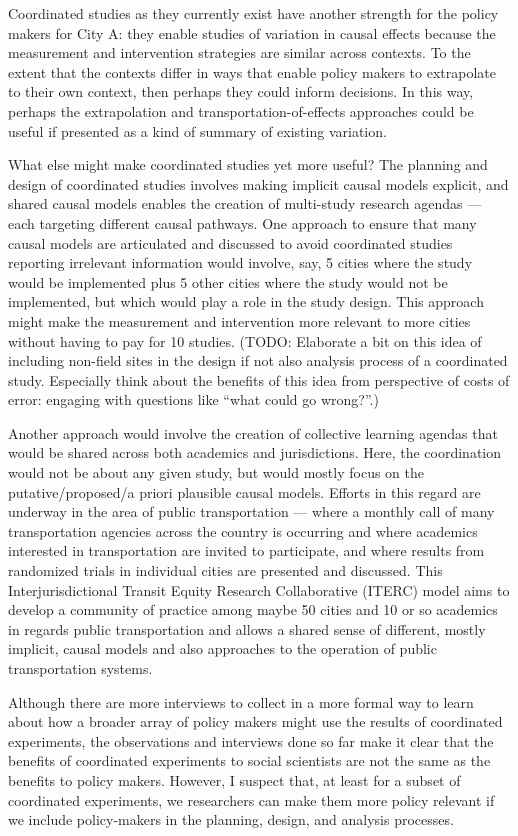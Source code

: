 \documentclass[
  11pt,
]{article}
\begin{document}
Coordinated studies as they currently exist have another strength for
the policy makers for City A: they enable studies of variation in causal
effects because the measurement and intervention strategies are similar
across contexts. To the extent that the contexts differ in ways that
enable policy makers to extrapolate to their own context, then perhaps
they could inform decisions. In this way, perhaps the extrapolation and
transportation-of-effects approaches could be useful if presented as a
kind of summary of existing variation.

What else might make coordinated studies yet more useful? The planning
and design of coordinated studies involves making implicit causal models
explicit, and shared causal models enables the creation of multi-study
research agendas --- each targeting different causal pathways. One
approach to ensure that many causal models are articulated and discussed
to avoid coordinated studies reporting irrelevant information would
involve, say, 5 cities where the study would be implemented plus 5 other
cities where the study would not be implemented, but which would play a
role in the study design. This approach might make the measurement and
intervention more relevant to more cities without having to pay for 10
studies. (TODO: Elaborate a bit on this idea of including non-field
sites in the design if not also analysis process of a coordinated study.
Especially think about the benefits of this idea from perspective of
costs of error: engaging with questions like ``what could go wrong?''.)

Another approach would involve the creation of collective learning
agendas that would be shared across both academics and jurisdictions.
Here, the coordination would not be about any given study, but would
mostly focus on the putative/proposed/a priori plausible causal models.
Efforts in this regard are underway in the area of public transportation
--- where a monthly call of many transportation agencies across the
country is occurring and where academics interested in transportation
are invited to participate, and where results from randomized trials in
individual cities are presented and discussed. This Interjurisdictional
Transit Equity Research Collaborative (ITERC) model aims to develop a
community of practice among maybe 50 cities and 10 or so academics in
regards public transportation and allows a shared sense of different,
mostly implicit, causal models and also approaches to the operation of
public transportation systems.

Although there are more interviews to collect in a more formal way to
learn about how a broader array of policy makers might use the results
of coordinated experiments, the observations and interviews done so far
make it clear that the benefits of coordinated experiments to social
scientists are not the same as the benefits to policy makers. However, I
suspect that, at least for a subset of coordinated experiments, we
researchers can make them more policy relevant if we include
policy-makers in the planning, design, and analysis processes.

\printbibliography
\end{document}

